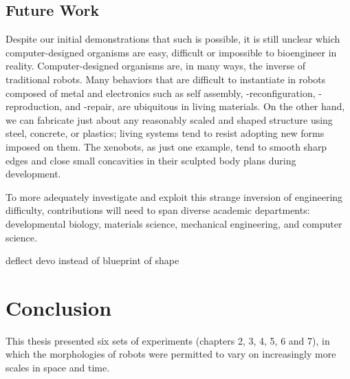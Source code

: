 \subsection{Future Work}

Despite our initial demonstrations that such is possible, 
it is still unclear which computer-designed organisms are easy, difficult or impossible to bioengineer in reality.
Computer-designed organisms are, in many ways, the inverse of traditional robots.
Many behaviors that are difficult to instantiate in robots composed of metal and electronics such as self assembly, -reconfiguration, -reproduction, and -repair, are ubiquitous in living materials.
On the other hand, we can fabricate just about any reasonably scaled and shaped structure using steel, concrete, or plastics; living systems tend to resist adopting new forms imposed on them.
The xenobots, as just one example, tend to smooth sharp edges and close small concavities in their sculpted body plans during development.

To more adequately investigate and exploit this strange inversion of engineering difficulty, contributions will need to span diverse academic departments: developmental biology, materials science, mechanical engineering, and computer science.


deflect devo instead of blueprint of shape


\section{Conclusion}

This thesis presented six sets of experiments (chapters 2, 3, 4, 5, 6 and 7), in which the morphologies of robots were permitted to vary on increasingly more scales in space and time.


